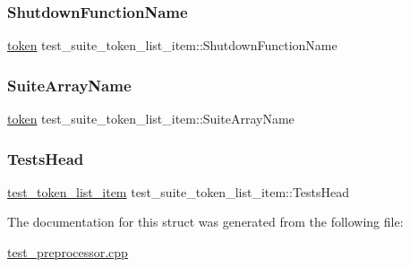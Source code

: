 \subsubsection{\texorpdfstring{Shutdown\+Function\+Name}{ShutdownFunctionName}}
{\footnotesize\ttfamily \hyperlink{structtoken}{token} test\+\_\+suite\+\_\+token\+\_\+list\+\_\+item\+::\+Shutdown\+Function\+Name}

\mbox{\label{structtest__suite__token__list__item_a33bab1f9cd9b0c869eadfcbde0320d86}} 
\subsubsection{\texorpdfstring{Suite\+Array\+Name}{SuiteArrayName}}
{\footnotesize\ttfamily \hyperlink{structtoken}{token} test\+\_\+suite\+\_\+token\+\_\+list\+\_\+item\+::\+Suite\+Array\+Name}

\mbox{\label{structtest__suite__token__list__item_a733adf7402d148f6d1d713f7ad08b835}} 
\subsubsection{\texorpdfstring{Tests\+Head}{TestsHead}}
{\footnotesize\ttfamily \hyperlink{structtest__token__list__item}{test\+\_\+token\+\_\+list\+\_\+item} test\+\_\+suite\+\_\+token\+\_\+list\+\_\+item\+::\+Tests\+Head}



The documentation for this struct was generated from the following file\+:\begin{DoxyCompactItemize}
\item 
\hyperlink{test__preprocessor_8cpp}{test\+\_\+preprocessor.\+cpp}\end{DoxyCompactItemize}
